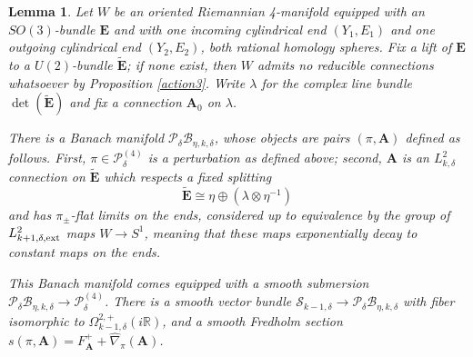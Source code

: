 \documentclass[10pt,a4paper]{amsart}
\newtheorem{lemma}[theorem]{Lemma}
\theoremstyle{definition}
\theoremstyle{remark}
\numberwithin{figure}{qchap}
\begin{document}
\begin{lemma}\label{pi-Banach}Let $W$ be an oriented Riemannian 4-manifold equipped with an $SO(3)$-bundle $\mathbf{E}$ and with one incoming cylindrical end $(Y_1,E_1)$ and one outgoing cylindrical end $(Y_2, E_2)$, both rational homology spheres. Fix a lift of $\mathbf{E}$ to a $U(2)$-bundle $\widetilde{\mathbf{E}}$; if none exist, then $W$ admits no reducible connections whatsoever by Proposition \ref{action3}. Write $\lambda$ for the complex line bundle $\det(\widetilde{\mathbf{E}})$ and fix a connection $\mathbf{A}_0$ on $\lambda$.

There is a Banach manifold $\mathcal P_{\delta} \mathcal B_{\eta, k, \delta}$, whose objects are pairs $(\pi, \mathbf{A})$ defined as follows. First, $\pi \in \mathcal P^{(4)}_\delta$ is a perturbation as defined above; second, $\mathbf{A}$ is an $L^2_{k,\delta}$ connection on $\widetilde{\mathbf{E}}$ which respects a fixed splitting
$$\widetilde{\mathbf{E}} \cong \eta \oplus (\lambda \otimes \eta^{-1})$$
and has $\pi_\pm$-flat limits on the ends, considered up to equivalence by the group of $L^2_{k+1,\delta,\textup{ext}}$ maps $W \to S^1$, meaning that these maps exponentially decay to constant maps on the ends.

This Banach manifold comes equipped with a smooth submersion $\mathcal P_{\delta} \mathcal B_{\eta, k, \delta} \to \mathcal P^{(4)}_{\delta}$. There is a smooth vector bundle $\mathcal S_{k-1,\delta} \to \mathcal P_{\delta} \mathcal B_{\eta, k, \delta}$ with fiber isomorphic to $\Omega^{2,+}_{k-1,\delta}(i\mathbb R)$, and a smooth Fredholm section $s(\pi, \mathbf{A}) = F_{\mathbf{A}}^+ + \widehat{\nabla}_\pi(\mathbf{A})$.
\end{lemma}
\end{document}
